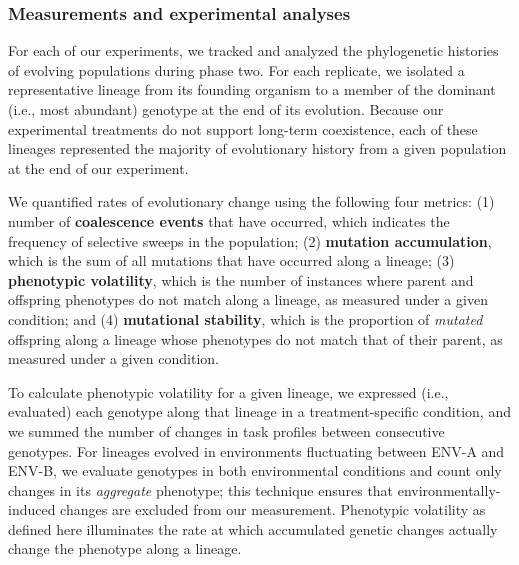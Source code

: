 \subsubsection{Measurements and experimental analyses}



For each of our experiments, we tracked and analyzed the phylogenetic histories of evolving populations during phase two. 
For each replicate, we isolated a representative lineage from its founding organism to a member of the dominant (i.e., most abundant) genotype at the end of its evolution.
Because our experimental treatments do not support long-term coexistence, each of these lineages represented the majority of evolutionary history from a given population at the end of our experiment.

We quantified rates of evolutionary change using the following four metrics:
(1) number of \textbf{coalescence events} that have occurred, which indicates the frequency of selective sweeps in the population;
(2) \textbf{mutation accumulation}, which is the sum of all mutations that have occurred along a lineage;
(3) \textbf{phenotypic volatility}, which is the number of instances where parent and offspring phenotypes do not match along a lineage, as measured under a given condition;
and (4) \textbf{mutational stability}, which is the proportion of \textit{mutated} offspring along a lineage whose phenotypes do not match that of their parent, as measured under a given condition.

To calculate phenotypic volatility for a given lineage, we expressed (i.e., evaluated) each genotype along that lineage in a treatment-specific condition, and we summed the number of changes in task profiles between consecutive genotypes.
For lineages evolved in environments fluctuating between ENV-A and ENV-B, we evaluate genotypes in both environmental conditions and count only changes in its \textit{aggregate} phenotype; this technique ensures that environmentally-induced changes are excluded from our measurement.
Phenotypic volatility as defined here illuminates the rate at which accumulated genetic changes actually change the phenotype along a lineage.

